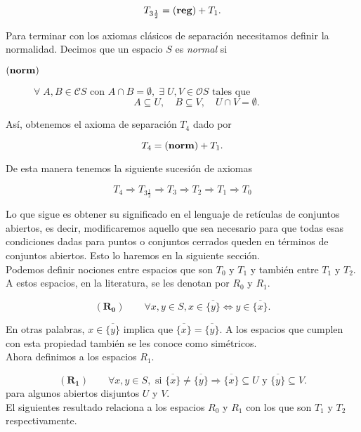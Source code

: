 \[
T_{3\frac{1}{2}}=(\mbox{\textbf{reg}}) + T_1.
\]

Para terminar con los axiomas clásicos de separación necesitamos definir la normalidad. Decimos que un espacio $S$ es \emph{normal} si 

\begin{description}
\item[$(\mbox{\textbf{norm}})$] $\forall\; A, B\in \mathcal{C}S \mbox{ con } A\cap B=\emptyset,\; \exists\; U, V\in \mathcal{O}S \mbox{ tales que }$
\[
A\subseteq U,\quad B\subseteq V, \quad U\cap V=\emptyset.
\]
\end{description}

Así, obtenemos el axioma de separación $T_4$ dado por

\[
T_4=(\mbox{\textbf{norm}}) + T_1.
\]

De esta manera tenemos la siguiente sucesión de axiomas

\[
T_4\Rightarrow  T_{3\frac{1}{2}} \Rightarrow T_3 \Rightarrow T_2 \Rightarrow T_1 \Rightarrow T_0
\]

Lo que sigue es obtener su significado en el lenguaje de retículas de conjuntos abiertos, es decir, modificaremos aquello que sea necesario para que todas esas condiciones dadas para puntos o conjuntos cerrados queden en términos de conjuntos abiertos. Esto lo haremos en la siguiente sección.\\

Podemos definir nociones entre espacios que son $T_0$ y $T_1$ y también entre $T_1$ y $T_2$. A estos espacios, en la literatura, se les denotan por $R_0$ y $R_1$. 

\[
(\mathbf{R_0})\qquad \forall x, y\in S, x\in \overline{\{y\}} \Leftrightarrow y\in \overline{\{x\}}.
\]

En otras palabras, $x\in \overline{\{y\}}$ implica que $\overline{\{x\}}=\overline{\{y\}}$. A los espacios que cumplen con esta propiedad también se les conoce como simétricos.\\

Ahora definimos a los espacios $R_1$.

\[
(\mathbf{R_1})\qquad \forall x, y\in S, \mbox{ si } \overline{\{x\}}\neq \overline{\{y\}} \Rightarrow \overline{\{x\}}\subseteq U \mbox{ y } \overline{\{y\}}\subseteq V.
\]
para algunos abiertos disjuntos $U$ y $V$.\\

El siguientes resultado relaciona a los espacios $R_0$ y $R_1$ con los que son $T_1$ y $T_2$ respectivamente.

